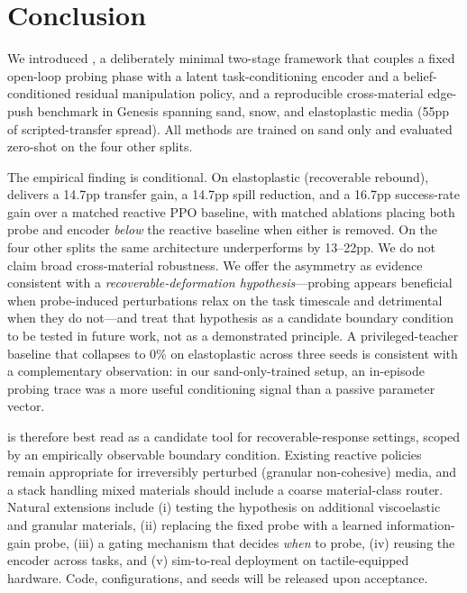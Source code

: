 \section{Conclusion}
\label{sec:conclusion}

We introduced \PTA{}, a deliberately minimal two-stage framework that couples a fixed open-loop probing phase with a latent task-conditioning encoder and a belief-conditioned residual manipulation policy, and a reproducible cross-material edge-push benchmark in Genesis spanning sand, snow, and elastoplastic media (55pp of scripted-transfer spread). All methods are trained on sand only and evaluated zero-shot on the four other splits.

The empirical finding is conditional. On elastoplastic (recoverable rebound), \PTA{} delivers a 14.7pp transfer gain, a 14.7pp spill reduction, and a 16.7pp success-rate gain over a matched reactive PPO baseline, with matched ablations placing both probe and encoder \emph{below} the reactive baseline when either is removed. On the four other splits the same architecture underperforms by 13--22pp. We do not claim broad cross-material robustness. We offer the asymmetry as evidence consistent with a \emph{recoverable-deformation hypothesis}---probing appears beneficial when probe-induced perturbations relax on the task timescale and detrimental when they do not---and treat that hypothesis as a candidate boundary condition to be tested in future work, not as a demonstrated principle. A privileged-teacher baseline that collapses to 0\% on elastoplastic across three seeds is consistent with a complementary observation: in our sand-only-trained setup, an in-episode probing trace was a more useful conditioning signal than a passive parameter vector.

\PTA{} is therefore best read as a candidate tool for recoverable-response settings, scoped by an empirically observable boundary condition. Existing reactive policies remain appropriate for irreversibly perturbed (granular non-cohesive) media, and a stack handling mixed materials should include a coarse material-class router. Natural extensions include (i) testing the hypothesis on additional viscoelastic and granular materials, (ii) replacing the fixed probe with a learned information-gain probe, (iii) a gating mechanism that decides \emph{when} to probe, (iv) reusing the encoder across tasks, and (v) sim-to-real deployment on tactile-equipped hardware. Code, configurations, and seeds will be released upon acceptance.
